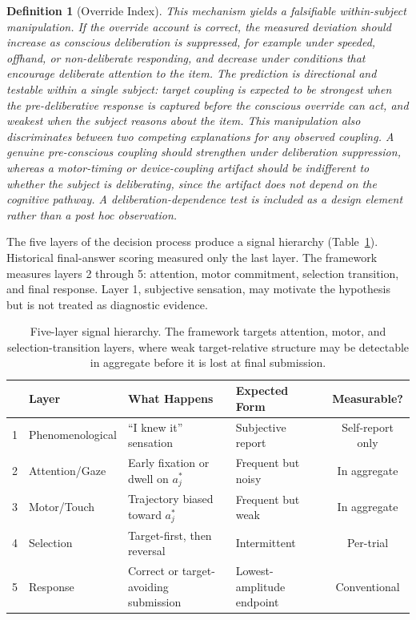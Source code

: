 \documentclass[11pt,letterpaper]{article}
\newtheorem{definition}{Definition}
\begin{document}
\begin{definition}[Override Index]
This mechanism yields a falsifiable within-subject manipulation. If the override account is correct, the measured deviation should increase as conscious deliberation is suppressed, for example under speeded, offhand, or non-deliberate responding, and decrease under conditions that encourage deliberate attention to the item. The prediction is directional and testable within a single subject: target coupling is expected to be strongest when the pre-deliberative response is captured before the conscious override can act, and weakest when the subject reasons about the item. This manipulation also discriminates between two competing explanations for any observed coupling. A genuine pre-conscious coupling should strengthen under deliberation suppression, whereas a motor-timing or device-coupling artifact should be indifferent to whether the subject is deliberating, since the artifact does not depend on the cognitive pathway. A deliberation-dependence test is included as a design element rather than a post hoc observation.
\end{definition}

The five layers of the decision process produce a signal hierarchy (Table~\ref{tab:behavioral}). Historical final-answer scoring measured only the last layer. The framework measures layers 2 through 5: attention, motor commitment, selection transition, and final response. Layer 1, subjective sensation, may motivate the hypothesis but is not treated as diagnostic evidence.

\begin{table}[h]
\centering
\caption{Five-layer signal hierarchy. The framework targets attention, motor, and selection-transition layers, where weak target-relative structure may be detectable in aggregate before it is lost at final submission.}
\label{tab:behavioral}
\small
\begin{tabular}{@{}clllc@{}}
\toprule
& \textbf{Layer} & \textbf{What Happens} & \textbf{Expected Form} & \textbf{Measurable?} \\
\midrule
1 & Phenomenological & ``I knew it'' sensation & Subjective report & Self-report only \\
2 & Attention/Gaze & Early fixation or dwell on $a_j^*$ & Frequent but noisy & In aggregate \\
3 & Motor/Touch & Trajectory biased toward $a_j^*$ & Frequent but weak & In aggregate \\
4 & Selection & Target-first, then reversal & Intermittent & Per-trial \\
5 & Response & Correct or target-avoiding submission & Lowest-amplitude endpoint & Conventional \\
\bottomrule
\end{tabular}
\end{table}
\end{document}
